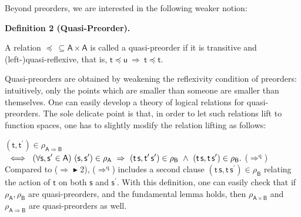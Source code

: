 \documentclass[10pt,a4paper]{amsart}
\begin{document}
 
 
Beyond preorders, we are interested in the following weaker notion:\par
 
 
 
\par\medskip\noindent\textbf{Definition 2 (Quasi-Preorder).}\par
 
 
A relation $\preceq\ \subseteq\mathsf{A}\times\mathsf{A}$ is called a quasi-preorder if it is transitive and (left-)quasi-reflexive, that is, $\mathsf{t}\preceq\mathsf{u}\ \Rightarrow\ \mathsf{t}\preceq\mathsf{t}$.\par
 
 
 
 
Quasi-preorders are obtained by weakening the reflexivity condition of preorders: intuitively, only the points which are smaller than someone are smaller than themselves. One can easily develop a theory of logical relations for quasi-preorders. The sole delicate point is that, in order to let such relations lift to function spaces, one has to slightly modify the relation lifting as follows:\par
    $\displaystyle(\mathsf{t},\mathsf{t}^{\prime})\in\rho_{\mathsf{A}\Rightarrow%
\mathsf{B}}$ $\displaystyle\ \iff\ (\forall\mathsf{s},\mathsf{s}^{\prime}\in\mathsf{A})\ (%
\mathsf{s},\mathsf{s}^{\prime})\in\rho_{\mathsf{A}}\ \Rightarrow\ (\mathsf{t}%
\,\mathsf{s},\mathsf{t^{\prime}}\,\mathsf{s^{\prime}})\in\rho_{\mathsf{B}}\ %
\land\ (\mathsf{t}\,\mathsf{s},\mathsf{t}\,\mathsf{s}^{\prime})\in\rho_{%
\mathsf{B}}.$  ($\Rightarrow^{\mathrm{q}}$)   
Compared to ($\Rightarrow$ \ensuremath{\blacktriangleright} 2), ($\Rightarrow^{\mathrm{q}}$) includes a second clause $(\mathsf{t}\,\mathsf{s},\mathsf{t}\,\mathsf{s}^{\prime})\in\rho_{\mathsf{B}}$ relating the action of $\mathsf{t}$ on both $\mathsf{s}$ and $\mathsf{s}^{\prime}$. With this definition, one can easily check that if $\rho_{\mathsf{A}},\rho_{\mathsf{B}}$ are quasi-preorders, and the fundamental lemma holds, then $\rho_{\mathsf{A}\times\mathsf{B}}$ and $\rho_{\mathsf{A}\Rightarrow\mathsf{B}}$ are quasi-preorders as well.\par
 
\end{document}
